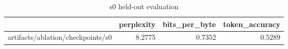 \begin{table}[t]
\centering
\begin{tabular}{lrrr}
\toprule
 & perplexity & bits\_per\_byte & token\_accuracy \\
\midrule
artifacts/ablation/checkpoints/s0 & 8.2775 & 0.7352 & 0.5289 \\
\bottomrule
\end{tabular}
\caption{s0 held-out evaluation}
\label{tab:s0-eval}
\end{table}
